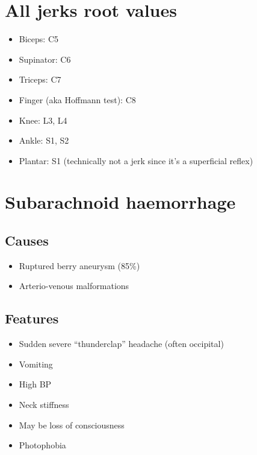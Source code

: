 \documentclass[
  12pt,
]{memoir}
\providecommand{\tightlist}{%
  \setlength{\itemsep}{0pt}\setlength{\parskip}{0pt}}
\begin{document}
\hypertarget{all-jerks-root-values}{%
\section{All jerks root values}\label{all-jerks-root-values}}

\begin{itemize}
\tightlist
\item
  Biceps: C5
\item
  Supinator: C6
\item
  Triceps: C7
\item
  Finger (aka Hoffmann test): C8
\item
  Knee: L3, L4
\item
  Ankle: S1, S2
\item
  Plantar: S1 (technically not a jerk since it's a superficial reflex)
\end{itemize}

\pagebreak

\hypertarget{subarachnoid-haemorrhage}{%
\section{Subarachnoid haemorrhage}\label{subarachnoid-haemorrhage}}

\hypertarget{causes-4}{%
\subsection{Causes}\label{causes-4}}

\begin{itemize}
\tightlist
\item
  Ruptured berry aneurysm (85\%)
\item
  Arterio-venous malformations
\end{itemize}

\hypertarget{features-6}{%
\subsection{Features}\label{features-6}}

\begin{itemize}
\tightlist
\item
  Sudden severe ``thunderclap'' headache (often occipital)
\item
  Vomiting
\item
  High BP
\item
  Neck stiffness
\item
  May be loss of consciousness
\item
  Photophobia
\end{itemize}
\end{document}
